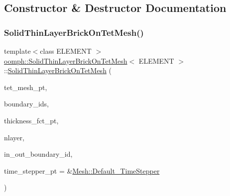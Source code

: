 \subsection{Constructor \& Destructor Documentation}
\mbox{\label{classoomph_1_1SolidThinLayerBrickOnTetMesh_ac06a05511ae55f0d554e940789661de1}} 
\subsubsection{\texorpdfstring{Solid\+Thin\+Layer\+Brick\+On\+Tet\+Mesh()}{SolidThinLayerBrickOnTetMesh()}}
{\footnotesize\ttfamily template$<$class E\+L\+E\+M\+E\+NT $>$ \\
\hyperlink{classoomph_1_1SolidThinLayerBrickOnTetMesh}{oomph\+::\+Solid\+Thin\+Layer\+Brick\+On\+Tet\+Mesh}$<$ E\+L\+E\+M\+E\+NT $>$\+::\hyperlink{classoomph_1_1SolidThinLayerBrickOnTetMesh}{Solid\+Thin\+Layer\+Brick\+On\+Tet\+Mesh} (\begin{DoxyParamCaption}\item[{\hyperlink{classoomph_1_1Mesh}{Mesh} $\ast$}]{tet\+\_\+mesh\+\_\+pt,  }\item[{const \hyperlink{classoomph_1_1Vector}{Vector}$<$ unsigned $>$ \&}]{boundary\+\_\+ids,  }\item[{\hyperlink{classoomph_1_1SolidThinLayerBrickOnTetMesh_ae4289650b0c0eccb2fd3d661b85e85ee}{Thickness\+Fct\+Pt}}]{thickness\+\_\+fct\+\_\+pt,  }\item[{const unsigned \&}]{nlayer,  }\item[{const \hyperlink{classoomph_1_1Vector}{Vector}$<$ \hyperlink{classoomph_1_1Vector}{Vector}$<$ unsigned $>$ $>$ \&}]{in\+\_\+out\+\_\+boundary\+\_\+id,  }\item[{\hyperlink{classoomph_1_1TimeStepper}{Time\+Stepper} $\ast$}]{time\+\_\+stepper\+\_\+pt = {\ttfamily \&\hyperlink{classoomph_1_1Mesh_a12243d0fee2b1fcee729ee5a4777ea10}{Mesh\+::\+Default\+\_\+\+Time\+Stepper}} }\end{DoxyParamCaption})\hspace{0.3cm}{\ttfamily [inline]}}



